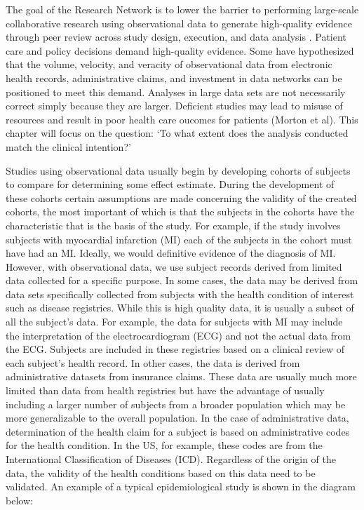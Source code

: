 \documentclass[11pt]{book}
\theoremstyle{definition}
\theoremstyle{definition}
\theoremstyle{definition}
\theoremstyle{remark}
\begin{document}
The goal of the Research Network is to lower the barrier to performing large-scale collaborative research using observational data to generate high-quality evidence through peer review across study design, execution, and data analysis \citep{Hripcsak2015}. Patient care and policy decisions demand high-quality evidence. Some have hypothesized that the volume, velocity, and veracity of observational data from electronic health records, administrative claims, and investment in data networks can be positioned to meet this demand. Analyses in large data sets are not necessarily correct simply because they are larger. Deficient studies may lead to misuse of resources and result in poor health care oucomes for patients (Morton et al). This chapter will focus on the question: `To what extent does the analysis conducted match the clinical intention?'

Studies using observational data usually begin by developing cohorts of subjects to compare for determining some effect estimate. During the development of these cohorts certain assumptions are made concerning the validity of the created cohorts, the most important of which is that the subjects in the cohorts have the characteristic that is the basis of the study. For example, if the study involves subjects with myocardial infarction (MI) each of the subjects in the cohort must have had an MI. Ideally, we would definitive evidence of the diagnosis of MI. However, with observational data, we use subject records derived from limited data collected for a specific purpose. In some cases, the data may be derived from data sets specifically collected from subjects with the health condition of interest such as disease registries. While this is high quality data, it is usually a subset of all the subject's data. For example, the data for subjects with MI may include the interpretation of the electrocardiogram (ECG) and not the actual data from the ECG. Subjects are included in these registries based on a clinical review of each subject's health record. In other cases, the data is derived from administrative datasets from insurance claims. These data are usually much more limited than data from health registries but have the advantage of usually including a larger number of subjects from a broader population which may be more generalizable to the overall population. In the case of administrative data, determination of the health claim for a subject is based on administrative codes for the health condition. In the US, for example, these codes are from the International Classification of Diseases (ICD). Regardless of the origin of the data, the validity of the health conditions based on this data need to be validated.
An example of a typical epidemiological study is shown in the diagram below:
\end{document}
